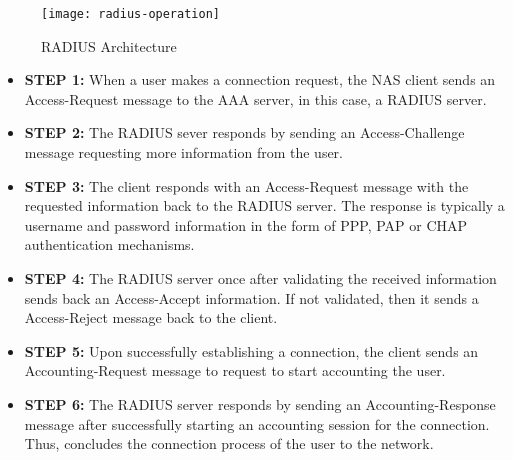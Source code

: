 \begin{figure}[H]
	\centering
	\texttt{[image: radius-operation]}
	\caption {RADIUS Architecture \cite{Radius_operation_img}}
	\label{fig:RADIUS_architecture}
	\vspace{-10pt}
\end{figure}

\begin{itemize}
	\item \textbf{STEP 1:} When a user makes a connection request, the NAS client sends an Access-Request message to the AAA server, in this case, a RADIUS server.
	\item \textbf{STEP 2:} The RADIUS sever responds by sending an Access-Challenge message requesting more information from the user.
	\item \textbf{STEP 3:} The client responds with an Access-Request message with the requested information back to the RADIUS server. The response is typically a username and password information in the form of PPP, PAP or CHAP authentication mechanisms.
	\item \textbf{STEP 4:} The RADIUS server once after validating the received information sends back an Access-Accept information. If not validated, then it sends a Access-Reject message back to the client.
	\item \textbf{STEP 5:} Upon successfully establishing a connection, the client sends an Accounting-Request message to request to start accounting the user.
	\item \textbf{STEP 6:} The RADIUS server responds by sending an Accounting-Response message after successfully starting an accounting session for the connection. Thus, concludes the connection process of the user to the network.
	
\end{itemize}

